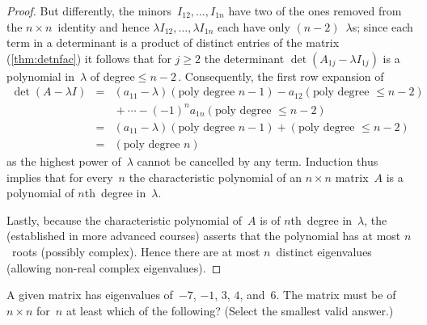 \begin{proof}
But differently, the minors~\(I_{12},\ldots,I_{1n}\) have two of the ones removed from the \(n\times n\)~identity and hence \(\lambda I_{12},\ldots,\lambda I_{1n}\) each have only \((n-2)\)~\(\lambda\)s; since each term in a determinant is a product of distinct entries of the matrix (\cref{thm:detnfac}) it follows that for \(j\geq2\) the determinant \(\det(A_{1j}-\lambda I_{1j})\) is a polynomial in~\(\lambda\) of degree\({}\leq n-2\)\,.
Consequently, the first row expansion of 
\begin{eqnarray*}
\det(A-\lambda I)
&=&(a_{11}-\lambda)(\text{poly degree }n-1)
-a_{12}(\text{poly degree }\leq n-2)
\\&&{}
+\cdots-(-1)^{n}a_{1n}(\text{poly degree }\leq n-2)
\\&=&(a_{11}-\lambda)(\text{poly degree }n-1)
+(\text{poly degree }\leq n-2)
\\&=&(\text{poly degree }n)
\end{eqnarray*}
as the highest power of~\(\lambda\) cannot be cancelled by any term.
Induction thus implies that for every~\(n\) the characteristic polynomial of an \(n\times n\) matrix~\(A\) is a polynomial of \(n\)th~degree in~\(\lambda\).

Lastly, because the characteristic polynomial of~\(A\) is of \(n\)th~degree in~\(\lambda\), the  (established in more advanced courses) asserts that the polynomial has at most \(n\)~roots (possibly complex).  
Hence there are at most \(n\)~distinct eigenvalues (allowing non-real complex eigenvalues).
\end{proof}



\begin{activity}
A given matrix has eigenvalues of~\(-7\), \(-1\), \(3\), \(4\),  and~\(6\).
The matrix must be of  \(n\times n\) for~\(n\) at least which of the following? (Select the smallest valid answer.)
\end{activity}




